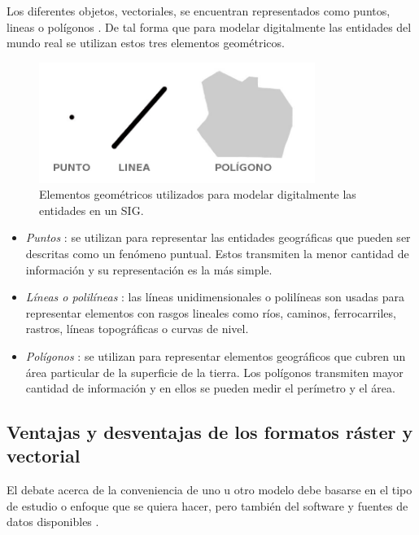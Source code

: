 Los diferentes objetos, vectoriales, se encuentran representados como puntos, lineas o polígonos
\cite{fAlonsoSig2006}. De tal forma que para modelar digitalmente las entidades del mundo real se
utilizan estos tres elementos geométricos.

\begin{figure}[!htbp]
\centering
\includegraphics[width=0.8\textwidth]{capitulo-2/graphics/dimensiones-datos.jpg}
\caption{\label{fig:sig-xyz} Elementos geométricos utilizados para modelar digitalmente las entidades en un SIG.}
\end{figure}

\begin{itemize}
    \item \textit{Puntos} : se utilizan para representar las entidades geográficas que pueden ser
    descritas como un fenómeno puntual. Estos transmiten la menor cantidad de información y su representación es la más simple.

    \item \textit{Líneas o polilíneas} : las líneas unidimensionales o polilíneas son usadas para
    representar elementos con rasgos lineales como ríos, caminos, ferrocarriles, rastros, líneas
    topográficas o curvas de nivel.

    \item \textit{Polígonos} : se utilizan para representar elementos geográficos que cubren un
    área particular de la superficie de la tierra. Los polígonos transmiten mayor cantidad de
    información y en ellos se pueden medir el perímetro y el área.
\end{itemize}

\subsection{Ventajas y desventajas de los formatos ráster y vectorial}

El debate acerca de la conveniencia de uno u otro modelo debe basarse en el tipo de estudio o
enfoque que se quiera hacer, pero también del software y fuentes de datos disponibles
\cite{fAlonsoSig2006}.

